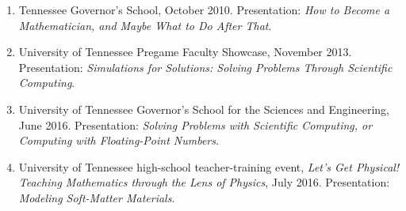 \documentclass[10pt,letterpaper]{article}
\begin{document}
    \begin{enumerate}
    \item
Tennessee Governor's School, October 2010. Presentation: {\sl How to Become a Mathematician, and Maybe What to Do After That}.
    
    \item
University of Tennessee Pregame Faculty Showcase, November 2013. Presentation: {\sl Simulations for Solutions: Solving Problems Through Scientific Computing}.
    
    \item
University of Tennessee Governor's School for the Sciences and Engineering, June 2016. Presentation: {\sl Solving Problems with Scientific Computing, or Computing with Floating-Point Numbers}.

	\item
University of Tennessee high-school teacher-training event, {\sl Let's Get Physical! Teaching Mathematics through the Lens of Physics}, July 2016. Presentation: {\sl Modeling Soft-Matter Materials}.

	\end{enumerate}
	
	\smallskip
	
\end{document}
